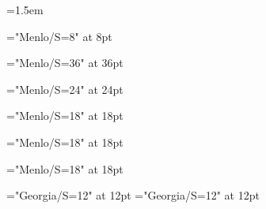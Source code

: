 \emergencystretch=1.5em

\def\displayfontname{Menlo}
\def\bodyfontname{Georgia}
\def\bodyfontsize{12}
\def\leading{16pt}
\baselineskip=\leading

\def\pageheaderfontname{\displayfontname}
\def\pageheaderfontsize{8}
\font\pageheaderfont="\pageheaderfontname/S=\pageheaderfontsize" at \pageheaderfontsize pt
\def\pagefooterfont{\pageheaderfont}

\def\titlepagetitlefontname{\displayfontname}
\def\titlepagetitlefontsize{36}
\font\titlepagetitlefont="\titlepagetitlefontname/S=\titlepagetitlefontsize" at \titlepagetitlefontsize pt

\def\titlepageauthorfontname{\displayfontname}
\def\titlepageauthorfontsize{24}
\font\titlepageauthorfont="\titlepageauthorfontname/S=\titlepageauthorfontsize" at \titlepageauthorfontsize pt

\def\titlepagepublisherfontname{\displayfontname}
\def\titlepagepublisherfontsize{18}
\font\titlepagepublisherfont="\titlepagepublisherfontname/S=\titlepagepublisherfontsize" at \titlepagepublisherfontsize pt

\def\infopagetitlefontname{\displayfontname}
\def\infopagetitlefontsize{18}
\font\infopagetitlefont="\infopagetitlefontname/S=\infopagetitlefontsize" at \infopagetitlefontsize pt

\def\sectiontitlefontname{\displayfontname}
\def\sectiontitlefontsize{18}
\font\sectiontitlefont="\displayfontname/S=\sectiontitlefontsize" at \sectiontitlefontsize pt

\font\bodyfont="\bodyfontname/S=\bodyfontsize" at \bodyfontsize pt
\font\leadinfont="\bodyfontname/S=\bodyfontsize" at \bodyfontsize pt

\def\leadin#1{{\leadinstyle#1}}
\def\leadinstyle{\noindent\leadinfont}

\def\emph#1{{\it #1}}

\raggedbottom
